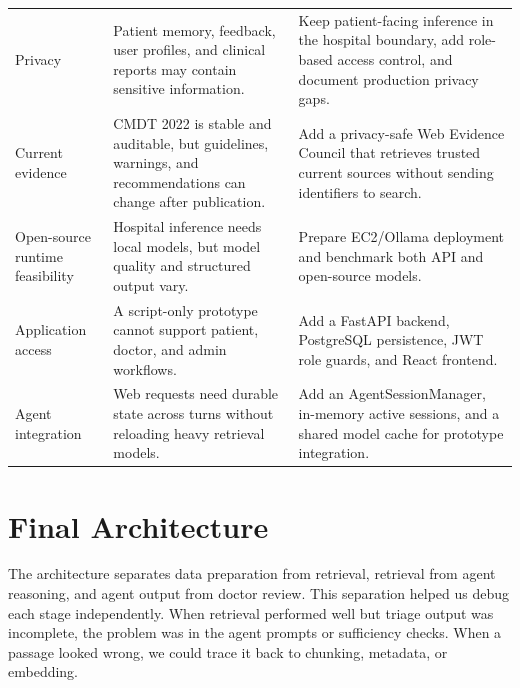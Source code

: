 \begin{longtable}{p{} p{} p{}}
Privacy & Patient memory, feedback, user profiles, and clinical reports may contain sensitive information. & Keep patient-facing inference in the hospital boundary, add role-based access control, and document production privacy gaps.\\
Current evidence & CMDT 2022 is stable and auditable, but guidelines, warnings, and recommendations can change after publication. & Add a privacy-safe Web Evidence Council that retrieves trusted current sources without sending identifiers to search.\\
Open-source runtime feasibility & Hospital inference needs local models, but model quality and structured output vary. & Prepare EC2/Ollama deployment and benchmark both API and open-source models.\\
Application access & A script-only prototype cannot support patient, doctor, and admin workflows. & Add a FastAPI backend, PostgreSQL persistence, JWT role guards, and React frontend.\\
Agent integration & Web requests need durable state across turns without reloading heavy retrieval models. & Add an AgentSessionManager, in-memory active sessions, and a shared model cache for prototype integration.\\
\bottomrule
\end{longtable}

\section{Final Architecture}

The architecture separates data preparation from retrieval, retrieval from agent reasoning, and agent output from doctor review. This separation helped us debug each stage independently. When retrieval performed well but triage output was incomplete, the problem was in the agent prompts or sufficiency checks. When a passage looked wrong, we could trace it back to chunking, metadata, or embedding.

